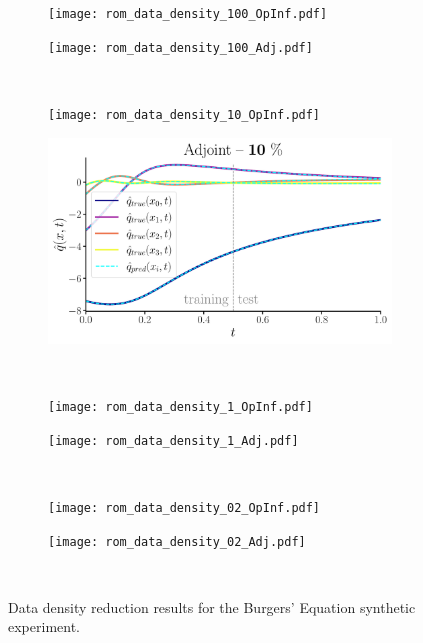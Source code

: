\vspace{1.0cm}

\begin{figure}[h!]
  \centering
  \begin{subfigure}[c]{0.49\textwidth}
      \centering
      \texttt{[image: rom\_data\_density\_100\_OpInf.pdf]}
  \end{subfigure}
  \begin{subfigure}[c]{0.49\textwidth}
      \centering
      \texttt{[image: rom\_data\_density\_100\_Adj.pdf]}
  \end{subfigure} \\[1ex]
    
  \begin{subfigure}[c]{0.49\textwidth}
      \centering
      \texttt{[image: rom\_data\_density\_10\_OpInf.pdf]}
  \end{subfigure} 
  \begin{subfigure}[c]{0.49\textwidth}
      \centering
      \includegraphics[width=\linewidth]{figures/rom_data_density_10_Adj.pdf}
  \end{subfigure} \\[1ex]
    
  \begin{subfigure}[c]{0.49\textwidth}
      \centering
      \texttt{[image: rom\_data\_density\_1\_OpInf.pdf]}
  \end{subfigure} 
  \begin{subfigure}[c]{0.49\textwidth}
      \centering
      \texttt{[image: rom\_data\_density\_1\_Adj.pdf]}
  \end{subfigure} \\[1ex]
    
  \begin{subfigure}[c]{0.49\textwidth}
      \centering
      \texttt{[image: rom\_data\_density\_02\_OpInf.pdf]}
  \end{subfigure} 
  \begin{subfigure}[c]{0.49\textwidth}
      \centering
      \texttt{[image: rom\_data\_density\_02\_Adj.pdf]}
  \end{subfigure} \\[1ex]
  \caption{Data density reduction results for the Burgers' Equation synthetic experiment.}
  \label{fig:five_by_two}
\end{figure}


